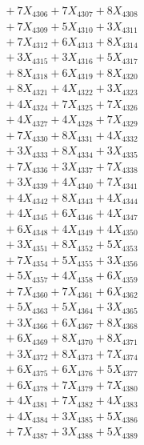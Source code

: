 \documentclass[a4paper,10pt]{article}
\begin{document}
{\begin{align}
&\;  + 7 X_{4306} + 7 X_{4307} + 8 X_{4308} \\[0.3ex]
&\;  + 7 X_{4309} + 5 X_{4310} + 3 X_{4311} \\[0.3ex]
&\;  + 7 X_{4312} + 6 X_{4313} + 8 X_{4314} \\[0.3ex]
&\;  + 3 X_{4315} + 3 X_{4316} + 5 X_{4317} \\[0.3ex]
&\;  + 8 X_{4318} + 6 X_{4319} + 8 X_{4320} \\[0.3ex]
&\;  + 8 X_{4321} + 4 X_{4322} + 3 X_{4323} \\[0.3ex]
&\;  + 4 X_{4324} + 7 X_{4325} + 7 X_{4326} \\[0.3ex]
&\;  + 4 X_{4327} + 4 X_{4328} + 7 X_{4329} \\[0.5ex]\allowbreak
&\;  + 7 X_{4330} + 8 X_{4331} + 4 X_{4332} \\[0.3ex]
&\;  + 3 X_{4333} + 8 X_{4334} + 3 X_{4335} \\[0.3ex]
&\;  + 7 X_{4336} + 3 X_{4337} + 7 X_{4338} \\[0.3ex]
&\;  + 3 X_{4339} + 4 X_{4340} + 7 X_{4341} \\[0.3ex]
&\;  + 4 X_{4342} + 8 X_{4343} + 4 X_{4344} \\[0.3ex]
&\;  + 4 X_{4345} + 6 X_{4346} + 4 X_{4347} \\[0.3ex]
&\;  + 6 X_{4348} + 4 X_{4349} + 4 X_{4350} \\[0.3ex]
&\;  + 3 X_{4351} + 8 X_{4352} + 5 X_{4353} \\[0.3ex]
&\;  + 7 X_{4354} + 5 X_{4355} + 3 X_{4356} \\[0.3ex]
&\;  + 5 X_{4357} + 4 X_{4358} + 6 X_{4359} \\[0.5ex]\allowbreak
&\;  + 7 X_{4360} + 7 X_{4361} + 6 X_{4362} \\[0.3ex]
&\;  + 5 X_{4363} + 5 X_{4364} + 3 X_{4365} \\[0.3ex]
&\;  + 3 X_{4366} + 6 X_{4367} + 8 X_{4368} \\[0.3ex]
&\;  + 6 X_{4369} + 8 X_{4370} + 8 X_{4371} \\[0.3ex]
&\;  + 3 X_{4372} + 8 X_{4373} + 7 X_{4374} \\[0.3ex]
&\;  + 6 X_{4375} + 6 X_{4376} + 5 X_{4377} \\[0.3ex]
&\;  + 6 X_{4378} + 7 X_{4379} + 7 X_{4380} \\[0.3ex]
&\;  + 4 X_{4381} + 7 X_{4382} + 4 X_{4383} \\[0.3ex]
&\;  + 4 X_{4384} + 3 X_{4385} + 5 X_{4386} \\[0.3ex]
&\;  + 7 X_{4387} + 3 X_{4388} + 5 X_{4389} \\[0.5ex]\allowbreak

\end{align}}
\end{document}
